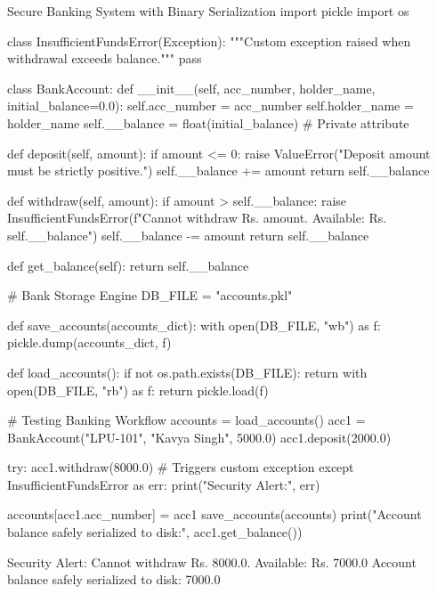 \begin{pythoncode}{Secure Banking System with Binary Serialization}
import pickle
import os

class InsufficientFundsError(Exception):
    """Custom exception raised when withdrawal exceeds balance."""
    pass

class BankAccount:
    def __init__(self, acc_number, holder_name, initial_balance=0.0):
        self.acc_number = acc_number
        self.holder_name = holder_name
        self.__balance = float(initial_balance) # Private attribute
        
    def deposit(self, amount):
        if amount <= 0:
            raise ValueError("Deposit amount must be strictly positive.")
        self.__balance += amount
        return self.__balance
        
    def withdraw(self, amount):
        if amount > self.__balance:
            raise InsufficientFundsError(f"Cannot withdraw Rs. {amount}. Available: Rs. {self.__balance}")
        self.__balance -= amount
        return self.__balance
        
    def get_balance(self):
        return self.__balance

# Bank Storage Engine
DB_FILE = "accounts.pkl"

def save_accounts(accounts_dict):
    with open(DB_FILE, "wb") as f:
        pickle.dump(accounts_dict, f)

def load_accounts():
    if not os.path.exists(DB_FILE):
        return {}
    with open(DB_FILE, "rb") as f:
        return pickle.load(f)

# Testing Banking Workflow
accounts = load_accounts()
acc1 = BankAccount("LPU-101", "Kavya Singh", 5000.0)
acc1.deposit(2000.0)

try:
    acc1.withdraw(8000.0) # Triggers custom exception
except InsufficientFundsError as err:
    print("Security Alert:", err)

accounts[acc1.acc_number] = acc1
save_accounts(accounts)
print("Account balance safely serialized to disk:", acc1.get_balance())
\end{pythoncode}

\begin{outputbox}
Security Alert: Cannot withdraw Rs. 8000.0. Available: Rs. 7000.0
Account balance safely serialized to disk: 7000.0
\end{outputbox}

